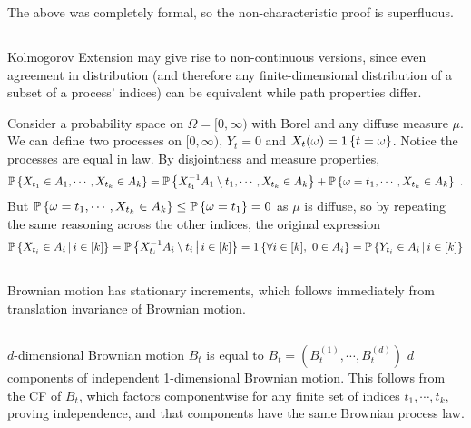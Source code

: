 \documentclass{article}
\begin{document}
       \subsubsection{}
       The above was completely formal, so the non-characteristic proof is superfluous.
       \subsection{}
       Kolmogorov Extension may give rise to non-continuous versions, since even agreement in distribution (and therefore any finite-dimensional distribution of a subset of a process' indices) can be equivalent while path properties differ.

       Consider a probability space on \(\Omega=[0,\infty)\) with Borel \sa and any diffuse measure \(\mu\). We can define two processes on \([0,\infty)\), \(Y_t=0\) and \(X_t(\omega)=1\left\{{t=\omega}\right\}\). Notice the processes are equal in law. By disjointness and measure properties,
       \[\operatorname{\mathbb{P}}\left\{{X_{t_1}\in A_1,\cdots, X_{t_k}\in A_k}\right\}=\operatorname{\mathbb{P}}\left\{{X_{t_1}^{-1}A_1\setminus t_1,\cdots, X_{t_k}\in A_k}\right\}+\operatorname{\mathbb{P}}\left\{{\omega= t_1,\cdots, X_{t_k}\in A_k}\right\}\,\,.\]
       But \(\operatorname{\mathbb{P}}\left\{{\omega = t_1,\cdots, X_{t_k}\in A_k}\right\}\le \operatorname{\mathbb{P}}\left\{{\omega = t_1}\right\}=0\) as \(\mu\) is diffuse, so by repeating the same reasoning across the other indices, the original expression
       \[
         \operatorname{\mathbb{P}}\left\{ X_{t_i}\in A_i \,\middle|\, i\in[k] \right\}=\operatorname{\mathbb{P}}\left\{ X_{t_i}^{-1}A_i\setminus t_i \,\middle|\, i\in[k] \right\}=1\left\{{\forall i\in[k],\,\,0\in A_i}\right\}=\operatorname{\mathbb{P}}\left\{ Y_{t_i}\in A_i \,\middle|\, i\in[k] \right\}
       \]
       \subsection{}

       Brownian motion has stationary increments, which follows immediately from translation invariance of Brownian motion.

       \subsection{}
       \(d\)-dimensional Brownian motion \(B_t\) is equal to \(B_t=(B_t^{(1)},\cdots,B_t^{(d)})\) \(d\) components of independent 1-dimensional Brownian motion. This follows from the CF of \(B_t\), which factors componentwise for any finite set of indices \(t_1,\cdots,t_k\), proving independence, and that components have the same Brownian process law.

       \subsection{}
       \label{translate}
\end{document}
